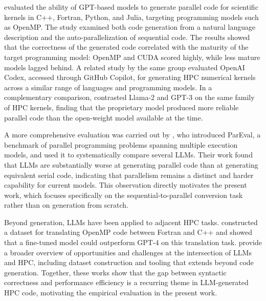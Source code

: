 \documentclass[conference]{IEEEtran}
\begin{document}

\cite{Godoy2024llm} evaluated the ability of GPT-based models to generate parallel code for scientific kernels in C++, Fortran, Python, and Julia, targeting programming models such as OpenMP. 
The study examined both code generation from a natural language description and the auto-parallelization of sequential code. 
The results showed that the correctness of the generated code correlated with the maturity of the target programming model: OpenMP and CUDA scored highly, while less mature models lagged behind. 
A related study by the same group \cite{Godoy2023codex} evaluated OpenAI Codex, accessed through GitHub Copilot, for generating HPC numerical kernels across a similar range of languages and programming models. 
In a complementary comparison, \cite{valerolara2023comparing} contrasted Llama-2 and GPT-3 on the same family of HPC kernels, finding that the proprietary model produced more reliable parallel code than the open-weight model available at the time.

A more comprehensive evaluation was carried out by \cite{nichols2024parallel}, who introduced ParEval, a benchmark of parallel programming problems spanning multiple execution models, and used it to systematically compare several LLMs. 
Their work found that LLMs are substantially worse at generating parallel code than at generating equivalent serial code, indicating that parallelism remains a distinct and harder capability for current models. 
This observation directly motivates the present work, which focuses specifically on the sequential-to-parallel conversion task rather than on generation from scratch. 

Beyond generation, LLMs have been applied to adjacent HPC tasks. 
\cite{lei2023dataset} constructed a dataset for translating OpenMP code between Fortran and C++ and showed that a fine-tuned model could outperform GPT-4 on this translation task. 
\cite{chen2023lm4hpc} provide a broader overview of opportunities and challenges at the intersection of LLMs and HPC, including dataset construction and tooling that extends beyond code generation. Together, these works show that the gap between syntactic correctness and performance efficiency is a recurring theme in LLM-generated HPC code, motivating the empirical evaluation in the present work.
\end{document}
